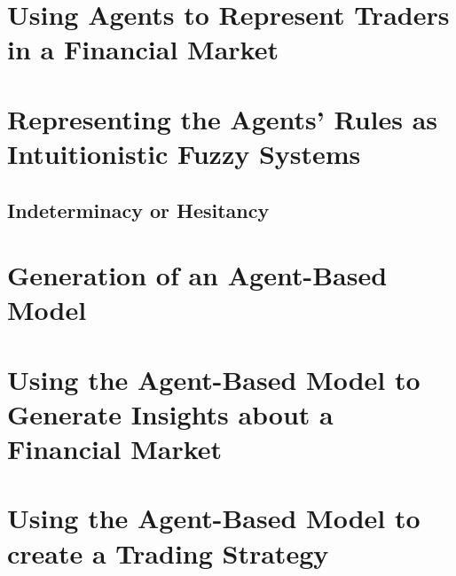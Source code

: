 \section{Using Agents to Represent Traders in a Financial Market}
\label{section:using-agents-to-represent-traders-in-a-financial-market}

\section{Representing the Agents' Rules as Intuitionistic Fuzzy Systems}
\label{section:representing-the-agents-rules-as-intuitionistic-fuzzy-systems}

\subsection{Indeterminacy or Hesitancy}
\label{subsection:indeterminacy-or-hesitancy}

\section{Generation of an Agent-Based Model}
\label{section:generation-of-an-agent-based-model}

\section{Using the Agent-Based Model to Generate Insights about a Financial
Market}
\label{section:using-the-agent-based-model-to-generate-insights-about-a-financial-market}

\section{Using the Agent-Based Model to create a Trading Strategy}
\label{section:using-the-agent-based-model-to-create-a-trading-strategy}
